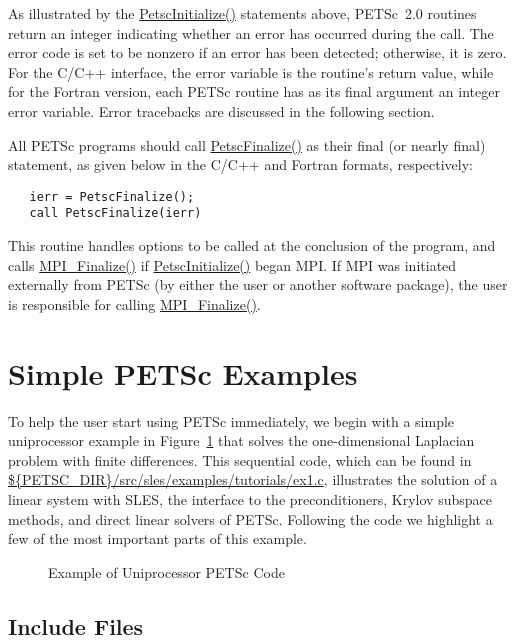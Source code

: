 As illustrated by the \url{PetscInitialize()} statements above,
PETSc~2.0 routines return an integer indicating whether an error has
occurred during the call.  The error code is set to be nonzero if an
error has been detected; otherwise, it is zero.  For the C/C++
interface, the error variable is the routine's return value, while for
the Fortran version, each PETSc routine has as its final argument an
integer error variable.  Error tracebacks are discussed in the following
section.

All PETSc programs should call \url{PetscFinalize()} 
as their final (or nearly final) statement, as given below in the C/C++
and Fortran formats, respectively:
\begin{verbatim}
   ierr = PetscFinalize();
   call PetscFinalize(ierr)
\end{verbatim}
This routine handles options to be called at the conclusion of
the program, and calls \url{MPI_Finalize()} 
if \url{PetscInitialize()}
began MPI. If MPI was initiated externally from PETSc (by either
the user or another software package), the user is
responsible for calling \url{MPI_Finalize()}. 

\section{Simple PETSc Examples}

\label{sec:simple}

To help the user start using PETSc immediately, we begin with a simple
uniprocessor example in Figure~\ref{fig:example1} that solves the
one-dimensional Laplacian problem with finite differences.  This
sequential code, which can be found in 
\url{${PETSC_DIR}/src/sles/examples/tutorials/ex1.c},
illustrates the solution of a linear system with SLES, the 
interface to the preconditioners, Krylov subspace methods, and direct
linear solvers of PETSc.  Following the code we highlight a few of the most important
parts of this example.  

\begin{figure}[H]
{\footnotesize
{}
}
\caption{Example of Uniprocessor PETSc Code}
\label{fig:example1}
\end{figure}

\subsection*{Include Files}

